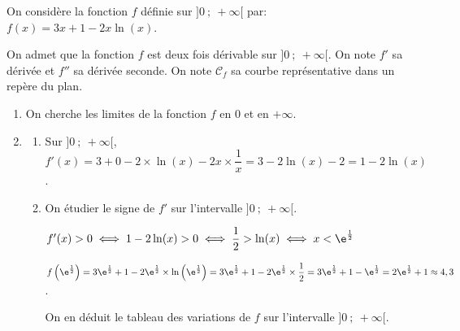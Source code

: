 
\medskip

On considère la fonction $f$ définie sur $]0~;~+\infty[$ par: $f(x) = 3x + 1 - 2x \ln (x)$.

On admet que la fonction $f$ est deux fois dérivable sur $]0~;~+\infty[$. 
On note $f'$ sa dérivée et $f''$ sa dérivée seconde.
On note $\mathcal{C}_f$ sa courbe représentative dans un repère du plan.


\begin{enumerate}
\item On cherche les limites de la fonction $f$ en 0 et en $+\infty$.

\item 
	\begin{enumerate}
		\item %
Sur $]0~;~+\infty[$, $f'(x)=	3+0-2\times\ln(x) -2x\times \dfrac{1}{x}=3-2\ln(x)-2 = 1-2\ln(x)$.
		
		\item On étudier le signe de $f'$  sur l'intervalle $]0~;~+\infty[$.
		

$f'(x)>0 \iff 1-2\ln(x)>0 \iff \dfrac{1}{2}>\ln(x) \iff x<\e^{\frac{1}{2}}$

$f\left (\e^{\frac{1}{2}}\right ) = 3 \e^{\frac{1}{2}} +1 -2 \e^{\frac{1}{2}} \times \ln\left (\e^{\frac{1}{2}}\right ) = 3 \e^{\frac{1}{2}} +1 -2 \e^{\frac{1}{2}} \times \dfrac{1}{2} =
3 \e^{\frac{1}{2}} +1 -  \e^{\frac{1}{2}} = 2  \e^{\frac{1}{2}} +1 \approx 4,3$.

On en déduit le tableau des variations de $f$ sur l'intervalle $]0~;~+\infty[$.


\end{enumerate}
\end{enumerate}
